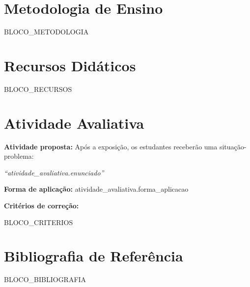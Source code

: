\documentclass[a4paper,11pt]{article}
\begin{document}
\section{Metodologia de Ensino}

{{BLOCO_METODOLOGIA}}

\section{Recursos Did\'aticos}

\begin{itemize}
{{BLOCO_RECURSOS}}
\end{itemize}

\section{Atividade Avaliativa}

\textbf{Atividade proposta:} Ap\'os a exposi\c{c}\~ao, os estudantes receber\~ao uma
situa\c{c}\~ao-problema:

\begin{mdframed}[backgroundcolor=cinzaclaro, linecolor=azulescuro,
                 linewidth=1pt, innerleftmargin=10pt, innerrightmargin=10pt,
                 innertopmargin=8pt, innerbottommargin=8pt]
\textit{``{{atividade_avaliativa.enunciado}}''}
\end{mdframed}

\vspace{0.5em}
\textbf{Forma de aplica\c{c}\~ao:} {{atividade_avaliativa.forma_aplicacao}}

\vspace{0.4em}
\textbf{Crit\'erios de corre\c{c}\~ao:}

\begin{itemize}
{{BLOCO_CRITERIOS}}
\end{itemize}

\section{Bibliografia de Refer\^encia}

\begin{itemize}[leftmargin=0pt, label={}]
{{BLOCO_BIBLIOGRAFIA}}
\end{itemize}
\end{document}
